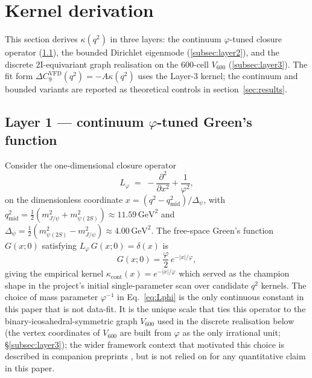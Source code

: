 \section{Kernel derivation}\label{sec:derivation}

This section derives $\kappa(q^{2})$ in three layers: the continuum
$\varphi$-tuned closure operator (\ref{subsec:layer1}), the bounded
Dirichlet eigenmode (\ref{subsec:layer2}), and the discrete
2I-equivariant graph realisation on the 600-cell $V_{600}$
(\ref{subsec:layer3}). The fit form
$\Delta C_{9}^{\mathrm{VFD}}(q^{2})=-A\kappa(q^{2})$ uses the Layer-3
kernel; the continuum and bounded variants are reported as theoretical
controls in section~\ref{sec:results}.

\subsection{Layer 1 — continuum $\varphi$-tuned Green's function}\label{subsec:layer1}

Consider the one-dimensional closure operator
\begin{equation}\label{eq:Lphi}
L_{\varphi} \;=\; -\frac{\partial^{2}}{\partial x^{2}} + \frac{1}{\varphi^{2}},
\end{equation}
on the dimensionless coordinate
$x = (q^{2}-q^{2}_{\mathrm{mid}})/\Delta_{\psi}$, with
$q^{2}_{\mathrm{mid}}=\tfrac{1}{2}(m^{2}_{J/\psi}+m^{2}_{\psi(2S)})
\approx 11.59\,\mathrm{GeV}^{2}$ and
$\Delta_{\psi}=\tfrac{1}{2}(m^{2}_{\psi(2S)}-m^{2}_{J/\psi})\approx
4.00\,\mathrm{GeV}^{2}$. The free-space Green's function $G(x;0)$
satisfying $L_{\varphi}\, G(x;0)=\delta(x)$ is
\begin{equation}\label{eq:greens_continuum}
G(x;0) = \frac{\varphi}{2}\, e^{-|x|/\varphi},
\end{equation}
giving the empirical kernel
$\kappa_{\mathrm{cont}}(x) = e^{-|x|/\varphi}$ which served as the
champion shape in the project's initial single-parameter scan over
candidate $q^{2}$ kernels. The choice of mass parameter
$\varphi^{-1}$ in Eq.~\eqref{eq:Lphi} is the only continuous
constant in this paper that is not data-fit. It is the unique scale
that ties this operator to the binary-icosahedral-symmetric graph
$V_{600}$ used in the discrete realisation below (the vertex
coordinates of $V_{600}$ are built from $\varphi$ as the only
irrational unit; \S\ref{subsec:layer3}); the wider framework context
that motivated this choice is described in companion preprints
\citep{SmartCrystallisation2026, SmartAdaptiveClosureTransport2026},
but is not relied on for any quantitative claim in this paper.


